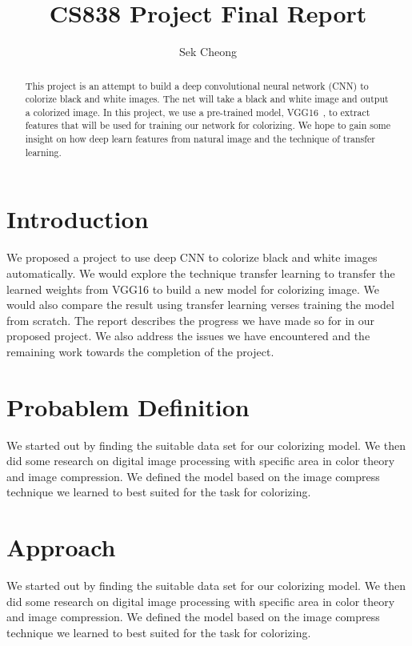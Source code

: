 \documentclass[12pt]{article}
\begin{document}
\title{CS838 Project Final Report}
\author{Sek Cheong}
\maketitle

\begin{abstract}
This project is an attempt to build a deep convolutional neural network (CNN) to colorize black and white images. The net will take a black and white image and output a colorized image. In this project, we use a pre-trained model, VGG16~\cite{vgg16}, to extract features that will be used for training our network for colorizing. We hope to gain some insight on how deep learn features from natural image and the technique of transfer learning.
\end{abstract}

\section{Introduction}
We proposed a project to use deep CNN to colorize black and white images automatically. We would explore the technique transfer learning to transfer the learned weights from VGG16 to build a new model for colorizing image. We would also compare the result using transfer learning verses training the model from scratch. The report describes the progress we have made so for in our proposed project. We also address the issues we have encountered and the remaining work towards the completion of the project. 


\section{Probablem Definition}
We started out by finding the suitable data set for our colorizing model. We then did some research on digital image processing with specific area in color theory and image compression. We defined the model based on the image compress technique we learned to best suited for the task for colorizing.


\section{Approach}
We started out by finding the suitable data set for our colorizing model. We then did some research on digital image processing with specific area in color theory and image compression. We defined the model based on the image compress technique we learned to best suited for the task for colorizing.
\end{document}
